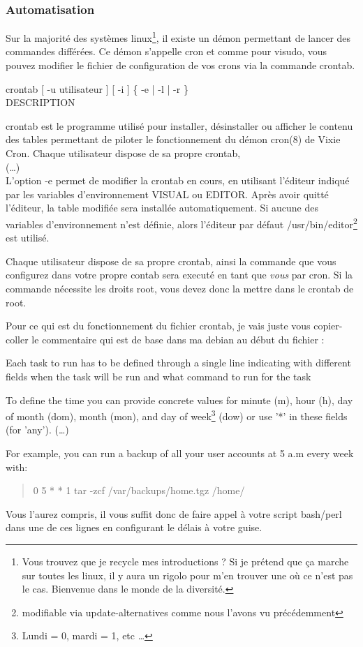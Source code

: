 \documentclass[a4paper,11pt]{article}
\newcommand{\commande}[1] {
    \begin{quote}
    \tt\raggedright #1 
    \end{quote}
}
\newcommand{\man}[2]{
    \begin{tcolorbox}[toprule=3mm,width=\textwidth,outer arc=0mm,colbacktitle=grayman,coltitle=black,colback={grayman},colframe={grayman},title={man : \tt #1}]
        \tt\raggedright #2
    \end{tcolorbox}
}
\newcommand{\mandesc}[1]{
    \begin{adjustwidth}{0.8cm}{}
        #1
    \end{adjustwidth}
}
\begin{document}
\subsubsection{Automatisation}
\par Sur la majorité des systèmes linux\footnote{Vous trouvez que je recycle mes introductions ? Si je prétend que ça marche sur toutes les linux, il y aura un rigolo pour m'en trouver une où ce n'est pas le cas. Bienvenue dans le monde de la diversité.}, il existe un démon permettant de lancer des commandes différées. Ce démon s'appelle cron et comme pour visudo, vous pouvez modifier le fichier de configuration de vos crons via la commande crontab.
\man{crontab}{crontab [ -u utilisateur ] [ -i ] \{ -e | -l | -r \}\\
DESCRIPTION
\mandesc{crontab est le programme utilisé pour installer, désinstaller ou afficher le contenu des tables permettant de piloter le fonctionnement du démon cron(8) de Vixie Cron. Chaque utilisateur dispose de sa propre crontab,\\
(\dots)\\
L'option -e permet de modifier la crontab en cours, en utilisant l'éditeur indiqué par les variables d'environnement VISUAL ou EDITOR. Après avoir quitté l'éditeur, la table modifiée sera installée automatiquement. Si aucune des variables d'environnement n'est définie, alors l'éditeur par défaut /usr/bin/editor\footnote{modifiable via update-alternatives comme nous l'avons vu précédemment} est utilisé.}}
\par Chaque utilisateur dispose de sa propre crontab, ainsi la commande que vous configurez dans votre propre contab sera executé en tant que \emph{vous} par cron. Si la commande nécessite les droits root, vous devez donc la mettre dans le crontab de root.
\par Pour ce qui est du fonctionnement du fichier crontab, je vais juste vous copier-coller le commentaire qui est de base dans ma debian au début du fichier :
\par Each task to run has to be defined through a single line indicating with different fields when the task will be run and what command to run for the task
\par To define the time you can provide concrete values for minute (m), hour (h), day of month (dom), month (mon), and day of week\footnote{Lundi = 0, mardi = 1, etc \dots} (dow) or use '*' in these fields (for 'any'). (\dots) 
\par For example, you can run a backup of all your user accounts at 5 a.m every week with:
\commande{0 5 * * 1 tar -zcf /var/backups/home.tgz /home/}
\par Vous l'aurez compris, il vous suffit donc de faire appel à votre script bash/perl dans une de ces lignes en configurant le délais à votre guise.
\end{document}
